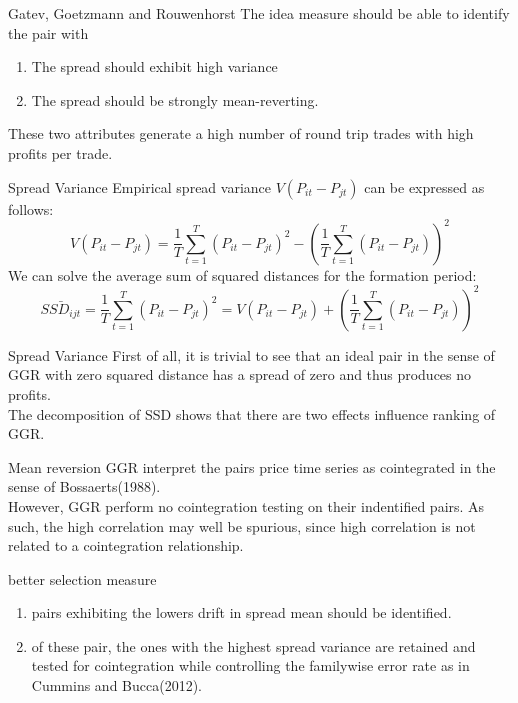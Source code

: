 \documentclass{beamer}
\begin{document}
\begin{frame}{Gatev, Goetzmann and Rouwenhorst}
	The idea measure should be able to identify the pair with
	\begin{enumerate}
			\item The spread should exhibit high variance 
			\item The spread should be strongly mean-reverting.
	\end{enumerate}
	These two attributes generate a high number of round trip trades with high profits per trade.
\end{frame}
\begin{frame}{Spread Variance}
	Empirical spread variance $V(P_{it} - P_{jt})$ can be expressed as follows:
	\[V(P_{it} - P_{jt}) = \frac{1}{T} \sum^T_{t=1}(P_{it} - P_{jt})^2 - (\frac{1}{T} \sum^T_{t=1}(P_{it} - P_{jt}))^2\]
	We can solve the average sum of squared distances for the formation period:
	\[\bar{SSD_{ijt} } = \frac{1}{T} \sum^{T}_{t=1} (P_{it} - P_{jt})^2 = V(P_{it} - P_{jt}) + (\frac{1}{T} \sum^T_{t=1}(P_{it} - P_{jt}))^2\]
\end{frame}
\begin{frame}{Spread Variance}
	First of all, it is trivial to see that an ideal pair in the sense of GGR with zero squared distance has a spread of zero and thus produces no profits. \\
	The decomposition of SSD shows that there are two effects influence ranking of GGR. \\
\end{frame}
\begin{frame}{Mean reversion}
	GGR interpret the pairs price time series as cointegrated in the sense of Bossaerts(1988). \\
	However, GGR perform no cointegration testing on their indentified pairs. As such, the high correlation may well be spurious, since high correlation is not related to a cointegration relationship.
\end{frame}
\begin{frame}{better selection measure}
	\begin{enumerate}
		\item pairs exhibiting the lowers drift in spread mean should be identified.
		\item of these pair, the ones with the highest spread variance are retained and tested for cointegration while controlling the familywise error rate as in Cummins and Bucca(2012).
	\end{enumerate}
\end{frame}
\end{document}
